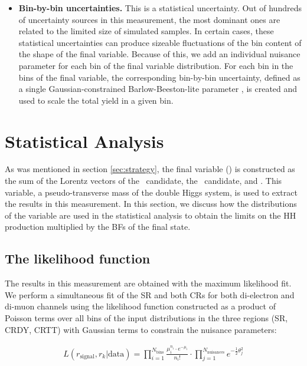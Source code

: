\begin{itemize}
\item{\bf Bin-by-bin uncertainties.} 
This is a statistical uncertainty. Out of hundreds of uncertainty sources in this measurement, the most dominant ones are related to the limited size of simulated samples. In certain cases, these statistical uncertainties can produce sizeable fluctuations of the bin content of the shape of the final variable. Because of this, we add an individual nuisance parameter for each bin of the final variable distribution. For each bin in the bins of the final variable, the corresponding bin-by-bin uncertainty, defined as a single Gaussian-constrained Barlow-Beeston-lite parameter \cite{Barlow-Beeston, autoMCStats}, is created and used to scale the total yield in a given bin.

\end{itemize}

\section{Statistical Analysis}
\label{sec:statistics}

As was mentioned in section \ref{sec:strategy}, the final variable (\mTHH) is constructed as the sum of the Lorentz vectors of the \Zll ~candidate, the \HBB~candidate, and \PTslash. This variable, a pseudo-transverse mass of the double Higgs system, is used to extract the results in this measurement. In this section, we discuss how the distributions of the \mTHH variable are used in the statistical analysis to obtain the limits on the HH production multiplied by the BFs of the final state.

\subsection{The likelihood function}
\label{sec:likelihood}

The results in this measurement are obtained with the maximum likelihood fit. We perform a simultaneous fit of the SR and both CRs for both di-electron and di-muon channels using the likelihood function constructed as a product of Poisson terms over all bins of the input \mTHH distributions in the three regions (SR, CRDY, CRTT) with Gaussian terms to constrain the nuisance parameters:

\begin{align*}
L(r_{\text{signal}}, r_{k}|\text{data}) = \prod_{i=1}^{N_{\mathrm{bins}}}\frac{\mu_{i}^{n_{i}}\cdot e^{-\mu_{i}}}{n_{i}!}
\cdot \prod_{j=1}^{N_{\mathrm{nuisances}}} e^{-\frac{1}{2}\theta_{j}^{2}}
\end{align*}

